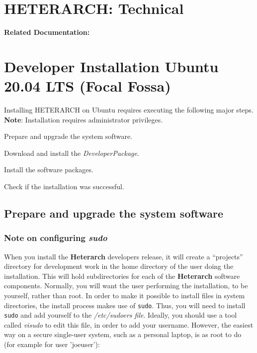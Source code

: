 \documentclass[12pt]{article}
\begin{document}
\section*{HETERARCH: Technical}

{\bf Related Documentation:} \\

\section*{Developer Installation Ubuntu 20.04 LTS (Focal Fossa)}

Installing HETERARCH on Ubuntu requires executing the following major steps. {\bf Note}: Installation requires administrator privileges.
\begin{description} 
   \item Prepare and upgrade the system software.
   \item Download and install the {\it DeveloperPackage}.
   \item Install the software packages.
   \item Check if the installation was successful. 
\end{description}

\subsection*{Prepare and upgrade the system software}

\subsubsection*{Note on configuring {\emph{sudo}}}

When you install the {\bf \small{Heterarch}} developers release, it
will create a ``projects'' directory for development work in the home
directory of the user doing the installation.  This will hold
subdirectories for each of the {\bf \small Heterarch} software
components.  Normally, you will want the user performing the
installation, to be yourself, rather than root.  In order to make it
possible to install files in system directories, the install process
makes use of {\tt sudo}.  Thus, you will need to install {\tt sudo}
and add yourself to the {\it /etc/sudoers file}.  Ideally, you should
use a tool called {\it visudo} to edit this file, in order to add your
username.  However, the easiest way on a secure single-user system,
such as a personal laptop, is as root to do (for example for user
'joeuser'):
\end{document}
